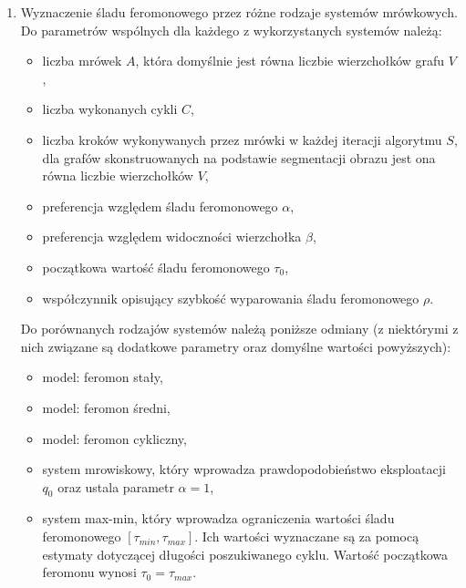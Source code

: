 {{{\begin{enumerate}
                \item Wyznaczenie śladu feromonowego przez różne rodzaje systemów mrówkowych. Do parametrów wspólnych
                dla każdego z wykorzystanych systemów należą:
                \begin{itemize}
                    \item liczba mrówek $A$, która domyślnie jest równa liczbie wierzchołków grafu $V$,
                    \item liczba wykonanych cykli $C$,
                    \item liczba kroków wykonywanych przez mrówki w każdej iteracji algorytmu $S$, dla grafów
                    skonstruowanych na podstawie segmentacji obrazu jest ona równa liczbie wierzchołków $V$,
                    \item preferencja względem śladu feromonowego $\alpha$,
                    \item preferencja względem widoczności wierzchołka $\beta$,
                    \item początkowa wartość śladu feromonowego $\tau_0$,
                    \item współczynnik opisujący szybkość wyparowania śladu feromonowego $\rho$.
                \end{itemize}

                Do porównanych rodzajów systemów należą poniższe odmiany (z niektórymi z nich związane są dodatkowe
                parametry oraz domyślne wartości powyższych):
                \begin{itemize}
                    \item model: feromon stały,
                    \item model: feromon średni,
                    \item model: feromon cykliczny,
                    \item system mrowiskowy, który wprowadza prawdopodobieństwo eksploatacji $q_0$ oraz ustala parametr
                    $\alpha = 1$,
                    \item system max-min, który wprowadza ograniczenia wartości śladu feromonowego $[\tau_{min},
                    \tau_{max}]$. Ich wartości wyznaczane są za pomocą estymaty dotyczącej długości poszukiwanego cyklu.
                    Wartość początkowa feromonu wynosi $\tau_0 = \tau_{max}$.
                \end{itemize}
            \end{enumerate}
        }
    }

}
